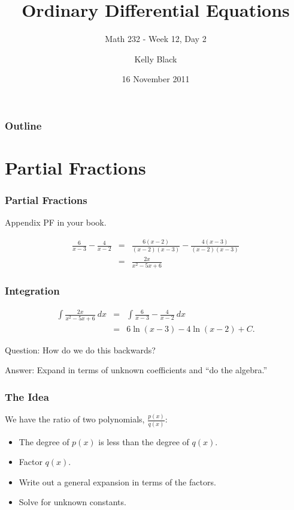 
\title{Ordinary Differential Equations}
\subtitle{Math 232 - Week 12, Day 2}

\author{Kelly Black}
\date{16 November 2011}

\begin{frame}
  \titlepage
\end{frame}

\begin{frame}
  \frametitle{Outline}
\end{frame}


\section{Partial Fractions}


\begin{frame}
  \frametitle{Partial Fractions}

  Appendix PF in your book.

  {
    \begin{eqnarray*}
      \frac{6}{x-3} - \frac{4}{x-2} & = & \frac{6(x-2)}{(x-2)(x-3)} - \frac{4(x-3)}{(x-2)(x-3)}\\
      & = & \frac{2x}{x^2-5x+6}
    \end{eqnarray*}
  }

\end{frame}


\begin{frame}
  \frametitle{Integration}

  \begin{eqnarray*}
    \int \frac{2x}{x^2-5x+6} ~ dx & = & \int \frac{6}{x-3} - \frac{4}{x-2} ~ dx \\
    & = & 6\ln(x-3) - 4\ln(x-2) + C.
  \end{eqnarray*}

  {
    Question: How do we do this backwards?

    Answer: Expand in terms of unknown coefficients and ``do the algebra.''
  }

\end{frame}


\begin{frame}
  \frametitle{The Idea}

  We have the ratio of two polynomials, $\frac{p(x)}{q(x)}$:
  \begin{itemize}
  \item The degree of $p(x)$ is less than the degree of $q(x)$.
  \item Factor $q(x)$.
  \item Write out a general expansion in terms of the factors.
  \item Solve for unknown constants.
  \end{itemize}

\end{frame}

